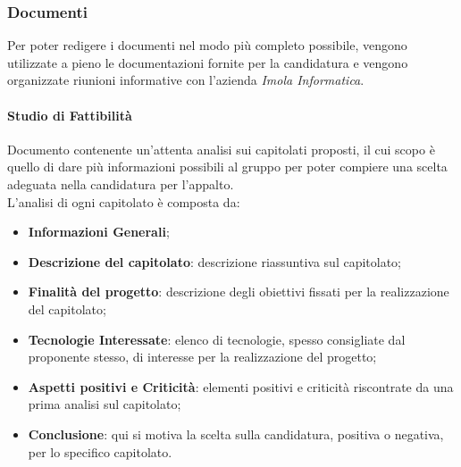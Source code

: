 \subsubsection{Documenti}
Per poter redigere i documenti nel modo più completo possibile, vengono utilizzate a pieno le documentazioni fornite per la candidatura e vengono organizzate riunioni informative con l'azienda  \textit{Imola Informatica}.
    
    \paragraph{Studio di Fattibilità}  \hfill \break
     Documento contenente un'attenta analisi sui capitolati proposti, il cui scopo è quello di dare più informazioni possibili al gruppo per poter compiere una scelta adeguata nella candidatura per l'appalto. \\
     L'analisi di ogni capitolato è composta da:
     \begin{itemize}
         \item \textbf{Informazioni Generali};
         \item \textbf{Descrizione del capitolato}: descrizione riassuntiva sul capitolato;
        \item \textbf{Finalità del progetto}: descrizione degli obiettivi fissati per la realizzazione del capitolato;
         \item \textbf{Tecnologie Interessate}: elenco di tecnologie, spesso consigliate dal proponente stesso, di interesse per la realizzazione del progetto;
         \item \textbf{Aspetti positivi e Criticità}: elementi positivi e criticità riscontrate da una prima analisi sul capitolato;
         \item \textbf{Conclusione}: qui si motiva la scelta sulla candidatura, positiva o negativa, per lo specifico capitolato.
    \end{itemize} 
     
